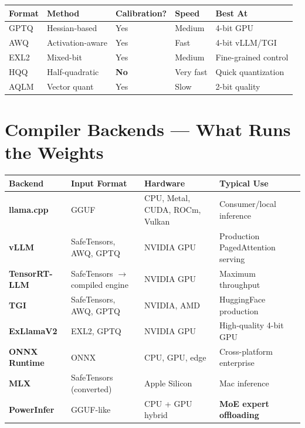 \documentclass[11pt,a4paper]{article}
\begin{document}
\begin{center}
\begin{tabular}{lllll}
\toprule
\textbf{Format} & \textbf{Method} & \textbf{Calibration?} & \textbf{Speed} & \textbf{Best At} \\
\midrule
GPTQ & Hessian-based & Yes & Medium & 4-bit GPU \\
AWQ & Activation-aware & Yes & Fast & 4-bit vLLM/TGI \\
EXL2 & Mixed-bit & Yes & Medium & Fine-grained control \\
HQQ & Half-quadratic & \textbf{No} & Very fast & Quick quantization \\
AQLM & Vector quant & Yes & Slow & 2-bit quality \\
\bottomrule
\end{tabular}
\end{center}

\section{Compiler Backends --- What Runs the Weights}

\begin{center}
\begin{tabular}{lL{2.5cm}L{3cm}L{4.5cm}}
\toprule
\textbf{Backend} & \textbf{Input Format} & \textbf{Hardware} & \textbf{Typical Use} \\
\midrule
\textbf{llama.cpp} & GGUF & CPU, Metal, CUDA, ROCm, Vulkan & Consumer/local inference \\
\textbf{vLLM} & SafeTensors, AWQ, GPTQ & NVIDIA GPU & Production PagedAttention serving \\
\textbf{TensorRT-LLM} & SafeTensors $\to$ compiled engine & NVIDIA GPU & Maximum throughput \\
\textbf{TGI} & SafeTensors, AWQ, GPTQ & NVIDIA, AMD & HuggingFace production \\
\textbf{ExLlamaV2} & EXL2, GPTQ & NVIDIA GPU & High-quality 4-bit GPU \\
\textbf{ONNX Runtime} & ONNX & CPU, GPU, edge & Cross-platform enterprise \\
\textbf{MLX} & SafeTensors (converted) & Apple Silicon & Mac inference \\
\textbf{PowerInfer} & GGUF-like & CPU + GPU hybrid & \textbf{MoE expert offloading} \\
\bottomrule
\end{tabular}
\end{center}
\end{document}
